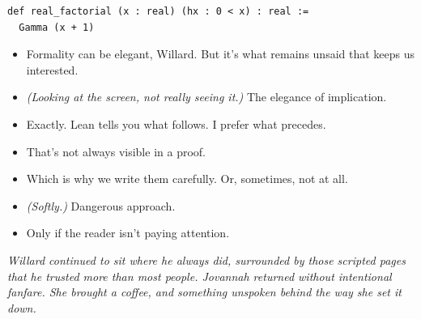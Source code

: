 {\footnotesize
\begin{verbatim}
def real_factorial (x : real) (hx : 0 < x) : real :=
  Gamma (x + 1)
\end{verbatim}
}

\begin{itemize}
    \item[\textbf{Jovannah:}] Formality can be elegant, Willard. But it’s what remains unsaid that keeps us interested.

    \item[\textbf{Willard:}] \textit{(Looking at the screen, not really seeing it.)} The elegance of implication.

    \item[\textbf{Jovannah:}] Exactly. Lean tells you what follows. I prefer what precedes.

    \item[\textbf{Willard:}] That’s not always visible in a proof.

    \item[\textbf{Jovannah:}] Which is why we write them carefully. Or, sometimes, not at all.

    \item[\textbf{Willard:}] \textit{(Softly.)} Dangerous approach.

    \item[\textbf{Jovannah:}] Only if the reader isn’t paying attention.
\end{itemize}


\textit{Willard continued to sit where he always did, surrounded by those scripted pages that he trusted more than most people. Jovannah returned without intentional fanfare. She brought a coffee, and something unspoken behind the way she set it down.}

